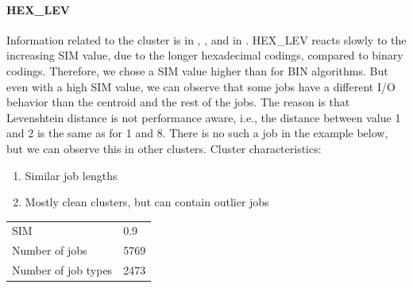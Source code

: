 \documentclass[]{llncs}
\begin{document}
\paragraph{HEX\_LEV}
Information related to the cluster is in , , and in .
HEX\_LEV reacts slowly to the increasing SIM value, due to the longer hexadecimal codings, compared to binary codings.
Therefore, we chose a SIM value higher than for BIN algorithms.
But even with a high SIM value, we can observe that some jobs have a different I/O behavior than the centroid and the rest of the jobs.
The reason is that Levenshtein distance is not performance aware, i.e., the distance between value 1 and 2 is the same as for 1 and 8.
There is no such a job in the example below, but we can observe this in other clusters.
Cluster characteristics:

\begin{enumerate}
 \item Similar job lengths
 \item Mostly clean clusters, but can contain outlier jobs
\end{enumerate}
\begingroup
	\centering
	\begin{tabular}{ll}
		SIM & 0.9 \\
		Number of jobs & 5769 \\
		Number of job types & 2473 \\
	\end{tabular}
	\label{tab:hex_lev:stats}
\endgroup
\end{document}

